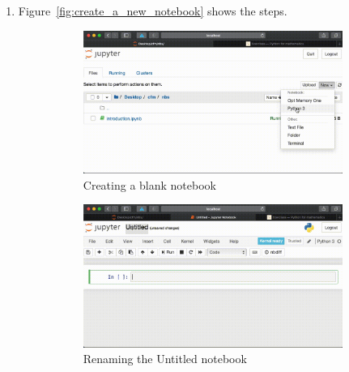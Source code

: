 \begin{enumerate}
    \item  Figure~\ref{fig:create_a_new_notebook} shows the steps.

        \begin{figure}[!htbp]
                \centering
                \begin{subfigure}[b]{0.4\textwidth}
                    \includegraphics[width=\textwidth]{assets/create_a_new_notebook/main00050.png}
                    \caption{Creating a blank notebook}
                    \label{fig:create_a_blank_notebook}
                \end{subfigure}
                \hfill
                \begin{subfigure}[b]{0.4\textwidth}
                    \includegraphics[width=\textwidth]{assets/create_a_new_notebook/main00069.png}
                    \caption{Renaming the Untitled notebook}
                    \label{fig:renaming_the_untitiled_notebook}
                \end{subfigure}
                \hfill
                \begin{subfigure}[b]{0.4\textwidth}

\end{subfigure}
\end{figure}
\end{enumerate}
